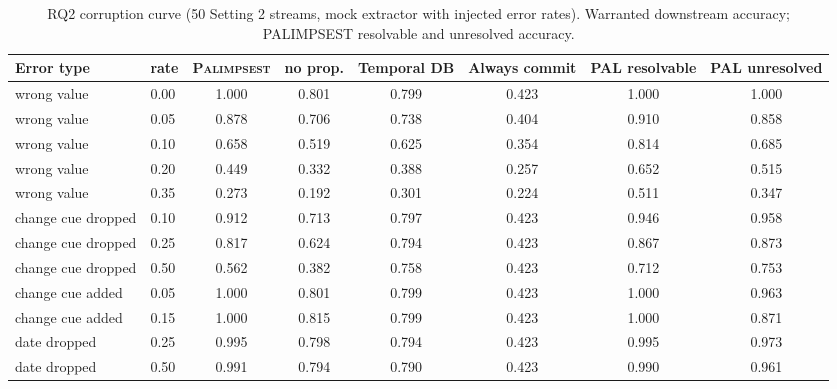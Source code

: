 \begin{table}[t]\centering\small
\caption{RQ2 corruption curve (50 Setting 2 streams, mock extractor with injected error rates). Warranted downstream accuracy; PALIMPSEST resolvable and unresolved accuracy.}\label{tab:noise}
\begin{tabular}{llcccccc}
\toprule
Error type & rate & \textsc{Palimpsest} & no prop. & Temporal DB & Always commit & PAL resolvable & PAL unresolved \\
\midrule
wrong value & 0.00 & 1.000 & 0.801 & 0.799 & 0.423 & 1.000 & 1.000 \\
wrong value & 0.05 & 0.878 & 0.706 & 0.738 & 0.404 & 0.910 & 0.858 \\
wrong value & 0.10 & 0.658 & 0.519 & 0.625 & 0.354 & 0.814 & 0.685 \\
wrong value & 0.20 & 0.449 & 0.332 & 0.388 & 0.257 & 0.652 & 0.515 \\
wrong value & 0.35 & 0.273 & 0.192 & 0.301 & 0.224 & 0.511 & 0.347 \\
change cue dropped & 0.10 & 0.912 & 0.713 & 0.797 & 0.423 & 0.946 & 0.958 \\
change cue dropped & 0.25 & 0.817 & 0.624 & 0.794 & 0.423 & 0.867 & 0.873 \\
change cue dropped & 0.50 & 0.562 & 0.382 & 0.758 & 0.423 & 0.712 & 0.753 \\
change cue added & 0.05 & 1.000 & 0.801 & 0.799 & 0.423 & 1.000 & 0.963 \\
change cue added & 0.15 & 1.000 & 0.815 & 0.799 & 0.423 & 1.000 & 0.871 \\
date dropped & 0.25 & 0.995 & 0.798 & 0.794 & 0.423 & 0.995 & 0.973 \\
date dropped & 0.50 & 0.991 & 0.794 & 0.790 & 0.423 & 0.990 & 0.961 \\
\bottomrule
\end{tabular}
\end{table}